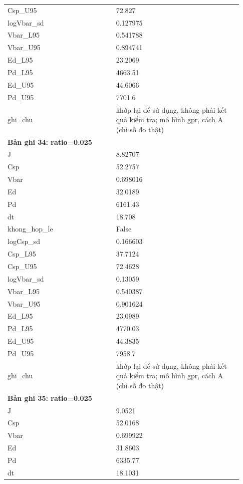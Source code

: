 \begin{longtable}{p{0.43\linewidth}p{0.50\linewidth}}
Csp\_\allowbreak U95 & 72.827 \\
logVbar\_\allowbreak sd & 0.127975 \\
Vbar\_\allowbreak L95 & 0.541788 \\
Vbar\_\allowbreak U95 & 0.894741 \\
Ed\_\allowbreak L95 & 23.2069 \\
Pd\_\allowbreak L95 & 4663.51 \\
Ed\_\allowbreak U95 & 44.6066 \\
Pd\_\allowbreak U95 & 7701.6 \\
ghi\_\allowbreak chu & khớp lại để sử dụng, không phải kết quả kiểm tra; mô hình gpr, cách A (chỉ số đo thật) \\
\midrule
\multicolumn{2}{p{0.95\linewidth}}{\textbf{Bản ghi 34: ratio=0.025}} \\
J & 8.82707 \\
Csp & 52.2757 \\
Vbar & 0.698016 \\
Ed & 32.0189 \\
Pd & 6161.43 \\
dt & 18.708 \\
khong\_\allowbreak hop\_\allowbreak le & False \\
logCsp\_\allowbreak sd & 0.166603 \\
Csp\_\allowbreak L95 & 37.7124 \\
Csp\_\allowbreak U95 & 72.4628 \\
logVbar\_\allowbreak sd & 0.13059 \\
Vbar\_\allowbreak L95 & 0.540387 \\
Vbar\_\allowbreak U95 & 0.901624 \\
Ed\_\allowbreak L95 & 23.0989 \\
Pd\_\allowbreak L95 & 4770.03 \\
Ed\_\allowbreak U95 & 44.3835 \\
Pd\_\allowbreak U95 & 7958.7 \\
ghi\_\allowbreak chu & khớp lại để sử dụng, không phải kết quả kiểm tra; mô hình gpr, cách A (chỉ số đo thật) \\
\midrule
\multicolumn{2}{p{0.95\linewidth}}{\textbf{Bản ghi 35: ratio=0.025}} \\
J & 9.0521 \\
Csp & 52.0168 \\
Vbar & 0.699922 \\
Ed & 31.8603 \\
Pd & 6335.77 \\
dt & 18.1031 \\

\end{longtable}
